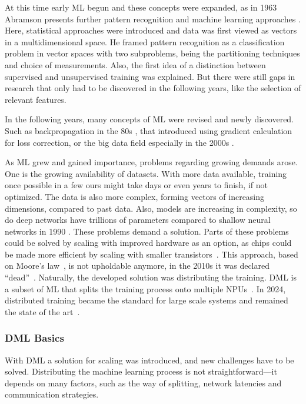 At this time early \ac{ML} begun and these concepts were expanded, as in 1963 Abramson presents further pattern recognition and machine learning approaches \cite{abramson_pattern_1963}. Here, statistical approaches were introduced and data was first viewed as vectors in a multidimensional space. He framed pattern recognition as a classification problem in vector spaces with two subproblems, being the partitioning techniques and choice of measurements. 
Also, the first idea of a distinction between supervised and unsupervised training was explained. But there were still gaps in research that only had to be discovered in the following years, like the selection of relevant features.

In the following years, many concepts of \ac{ML} were revised and newly discovered. Such as backpropagation in the 80s \cite{rojas_backpropagation_1996}, that introduced using gradient calculation for loss correction, or the big data field especially in the 2000s \cite{perez_karich_emergence_2025}. 

As \ac{ML} grew and gained importance, problems regarding growing demands arose. One is the growing availability of datasets. With more data available, training once possible in a few ours might take days or even years to finish, if not optimized. The data is also more complex, forming vectors of increasing dimensions, compared to past data.
Also, models are increasing in complexity, so do deep networks have trillions of parameters compared to shallow neural networks in 1990 \cite{oneto_limitations_2020}.
These problems demand a solution. Parts of these problems could be solved by scaling with improved hardware as an option, as chips could be made more efficient by scaling with smaller transistors~\cite{sevilla_compute_2022}. This approach, based on Moore's law~\cite{moore_cramming_2006}, is not upholdable anymore, in the 2010s it was declared ``dead''~\cite{theis_end_2017}.
Naturally, the developed solution was distributing the training. \ac{DML} is a subset of \ac{ML} that splits the training process onto multiple \acp{NPU}~\cite{bekkerman_scaling_2011}.
In 2024, distributed training became the standard for large scale systems and remained the state of the art~\cite{li_understanding_2024}. 

\subsubsection*{DML Basics}
With \ac{DML} a solution for scaling was introduced, and new challenges have to be solved.
Distributing the machine learning process is not straightforward---it depends on many factors, such as the way of splitting, network latencies and communication strategies.

